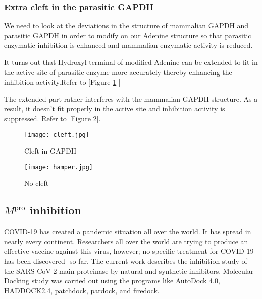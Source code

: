 \documentclass[12pt]{article}
\begin{document}
\subsubsection{Extra cleft in the parasitic GAPDH}

We need to look at the deviations in the structure of mammalian GAPDH and parasitic GAPDH in order to modify on our Adenine structure so that parasitic enzymatic inhibition is enhanced and mammalian enzymatic activity is reduced. 


It turns out that Hydroxyl terminal of modified Adenine can be extended to fit in the active site of parasitic enzyme more accurately thereby enhancing the inhibition activity.Refer to [Figure \ref{fig cleft} ]

           The extended part rather interferes with the mammalian GAPDH structure. As a result, it doesn't fit properly in the active site and inhibition activity is suppressed.
Refer to [Figure \ref{fig hampers}].\
\begin{figure}[h]
\centering
\texttt{[image: cleft.jpg]}
\caption{Cleft in GAPDH}
\label{fig cleft}
\end{figure}
\hfill
\begin{figure}[h]
\centering
\texttt{[image: hamper.jpg]}
\caption{No cleft}
\label{fig hampers}

\end{figure}
\clearpage
\subsection{$M^\text{pro}$ inhibition}
COVID-19 has created a pandemic situation all over the world. It has spread in nearly every continent. Researchers all over the world are trying to produce an effective vaccine against this virus, however; no specific treatment for COVID-19 has been discovered -so far. The current work describes the inhibition study of the SARS-CoV-2 main proteinase by natural and synthetic inhibitors.
Molecular Docking study was carried out using the programs like AutoDock 4.0, HADDOCK2.4, patchdock, pardock, and firedock. 

 
\end{document}

